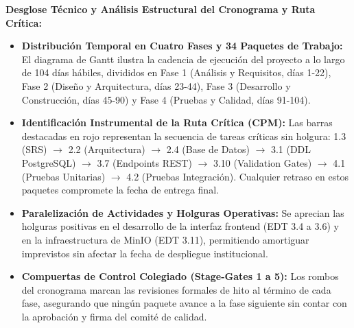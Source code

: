 \documentclass[12pt,a4paper]{article}
\begin{document}
\noindent
\noindent
\textbf{Desglose Técnico y Análisis Estructural del Cronograma y Ruta Crítica:}
\begin{itemize}[leftmargin=1.5em, itemsep=3pt]
    \item \textbf{Distribución Temporal en Cuatro Fases y 34 Paquetes de Trabajo:} El diagrama de Gantt ilustra la cadencia de ejecución del proyecto a lo largo de 104 días hábiles, divididos en Fase 1 (Análisis y Requisitos, días 1-22), Fase 2 (Diseño y Arquitectura, días 23-44), Fase 3 (Desarrollo y Construcción, días 45-90) y Fase 4 (Pruebas y Calidad, días 91-104).
    \item \textbf{Identificación Instrumental de la Ruta Crítica (CPM):} Las barras destacadas en rojo representan la secuencia de tareas críticas sin holgura: 1.3 (SRS) $\to$ 2.2 (Arquitectura) $\to$ 2.4 (Base de Datos) $\to$ 3.1 (DDL PostgreSQL) $\to$ 3.7 (Endpoints REST) $\to$ 3.10 (Validation Gates) $\to$ 4.1 (Pruebas Unitarias) $\to$ 4.2 (Pruebas Integración). Cualquier retraso en estos paquetes compromete la fecha de entrega final.
    \item \textbf{Paralelización de Actividades y Holguras Operativas:} Se aprecian las holguras positivas en el desarrollo de la interfaz frontend (EDT 3.4 a 3.6) y en la infraestructura de MinIO (EDT 3.11), permitiendo amortiguar imprevistos sin afectar la fecha de despliegue institucional.
    \item \textbf{Compuertas de Control Colegiado (Stage-Gates 1 a 5):} Los rombos del cronograma marcan las revisiones formales de hito al término de cada fase, asegurando que ningún paquete avance a la fase siguiente sin contar con la aprobación y firma del comité de calidad.
\end{itemize}
\end{document}
